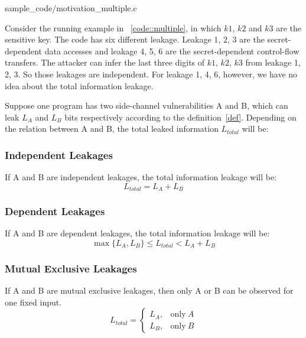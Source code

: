 
                 {sample_code/motivation_multiple.c}

                

Consider the running example in ~\ref{code::multiple}, in which $k1$, $k2$ and $k3$ are
the sensitive key. The code has six different leakage. Leakage 1, 2, 3 are the secret-dependent
data accesses and leakage 4, 5, 6 are the secret-dependent control-flow transfers.  
The attacker can infer the last three digits of
$k1$, $k2$, $k3$ from leakage 1, 2, 3. So those leakages are independent. For leakage 1, 4, 6, however,
we have no idea about the total information leakage.


Suppose one program has two side-channel vulnerabilities A and B, which can leak $L_A$ and $L_B$ bits respectively
according to the definition~\ref{def}. 
Depending on the relation between A and B, the total leaked information $L_{\mathit{total}}$ will be:

\subsubsection{Independent Leakages}
If A and B are independent leakages, the total information leakage will be:
$$L_{\mathit{total}} = L_A + L_B $$

\subsubsection{Dependent Leakages}
If A and B are dependent leakages, the total information leakage will be:
$$\max{\{L_A, L_B\}}  \leq L_{\mathit{total}} < L_A + L_B$$

\subsubsection{Mutual Exclusive Leakages}
If A and B are mutual exclusive leakages, then only A or B can be observed for one fixed input.
$$L_{\mathit{total}} = 
\begin{cases}
L_A, & \text{only} ~ A \\
L_B, & \text{only} ~ B
\end{cases}$$

